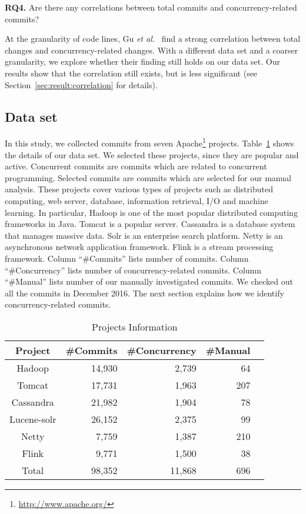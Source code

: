 \textbf{RQ4.} Are there any correlations between total commits and concurrency-related commits?

At the granularity of code lines, Gu \emph{et al.}~\cite{conf/sigsoft/GuJSZL15} find a strong correlation between total changes and concurrency-related changes. With a different data set and a coarser granularity, we explore whether their finding still holds on our data set. Our results show that the correlation still exists, but is less significant (see Section~\ref{sec:result:correlation} for details).

\subsection{Data set}
\label{sec:method:data}
In this study, we collected commits from seven Apache\footnote{\url{http://www.apache.org/}} projects. Table~\ref{table:dataset} shows the details of our data set. We selected these projects, since they are popular and active. Concurrent commits are commits which are related to concurrent programming. Selected commits are commits which are selected for our manual analysis. These projects cover various types of projects such as distributed computing, web server, database, information retrieval, I/O and machine learning. In particular, Hadoop is one of the most popular distributed computing frameworks in Java. Tomcat is a popular server. Cassandra is a database system that manages massive data. Solr is an enterprise search platform. Netty is an asynchronous network application framework. Flink is a stream processing framework. Column ``\#Commits'' lists number of commits. Column ``\#Concurrency'' lists number of concurrency-related commits. Column ``\#Manual'' lists number of our manually investigated commits. We checked out all the commits in December 2016. The next section explains how we identify concurrency-related commits.

\begin{table}
	\centering
	\caption{Projects Information}
    \label{table:dataset}
	\begin{tabular}{|c|r|r|r|r|}\hline
		Project&\#Commits&\#Concurrency&\#Manual\\\hline
		Hadoop&14,930&2,739&64\\
		Tomcat&17,731&1,963&207\\
		Cassandra&21,982&1,904&78\\
		Lucene-solr&26,152&2,375&99\\
		Netty&7,759&1,387&210\\
		Flink&9,771&1,500&38\\\hline
		Total&98,352&11,868&696\\\hline
	\end{tabular}
\end{table}

